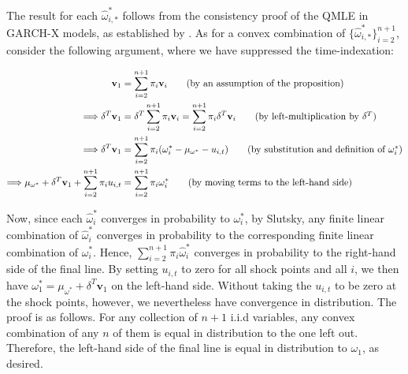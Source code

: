\documentclass[11pt,3p,review,authoryear]{elsarticle}
\newcommand{\weight}{\pi}
\newcommand{\x}{\textbf{v}}
\theoremstyle{definition}
\newenvironment{proof-of-proposition}[1][{}]{\noindent{\bf
    Proof of Proposition {#1}}
  \hspace*{.5em}}{\qed\bigskip\\}
\begin{document}
    \begin{proof-of-proposition}[\ref{adjustment}]
    The result for each $\hat\omega^{*}_{i,*}$ follows from the consistency proof of the QMLE in GARCH-X models, as established by \citet{han2014asymptotic}.  As for a convex combination of $\{\hat\omega^{*}_{i,*}\}_{i=2}^{n+1}$, consider the following argument, where we have suppressed the time-indexation:

    \begin{align}
    \x_{1} &= \sum^{n+1}_{i=2}\weight_{i}\x_{i} \tag{by an assumption of the proposition}\\
   \Longrightarrow \delta^{T}\x_{1} &= \delta^{T}\sum^{n+1}_{i=2}\weight_{i}\x_{i}  = \sum^{n+1}_{i=2}\weight_{i}\delta^{T}\x_{i}\tag{by left-multiplication by $\delta^{T}$}\\
    \Longrightarrow\delta^{T}\x_{1} &=\sum^{n+1}_{i=2}\pi_{i}(\omega_{i}^{*} - \mu_{\omega^{*}} - u_{i,t})\tag{by substitution and definition of $\omega^{*}_{i}$}\\
    \Longrightarrow\mu_{\omega^{*}} + \delta^{T}\x_{1} + \sum^{n+1}_{i=2}\pi_{i}u_{i,t} &= \sum^{n+1}_{i=2}\pi_{i}\omega_{i}^{*} \tag{by moving  terms to the left-hand side}
    \end{align}

Now, since each $\hat\omega^{*}_{i}$ converges in probability to $\omega^{*}_{i}$, by Slutsky, any finite linear combination of $\hat\omega^{*}_{i}$ converges in probability to the corresponding finite linear combination of $\omega^{*}_{i}$.  Hence, $\sum^{n+1}_{i=2}\pi_{i}\hat\omega_{i}^{*}$ converges in probability to the right-hand side of the final line.  By setting $u_{i,t}$ to zero for all shock points and all $i$, we then have $\omega_{1}^{*} = \mu_{\omega^{*}} + \delta^{T}\x_{1} $ on the left-hand side.  Without taking the $u_{i,t}$ to be zero at the shock points, however, we nevertheless have convergence in distribution.  The proof is as follows.  For any collection of $n+1$ i.i.d variables, any convex combination of any $n$ of them is equal in distribution to the one left out.  Therefore, the left-hand side of the final line is equal in distribution to $\omega_{1}$, as desired.
    \end{proof-of-proposition}
\end{document}
